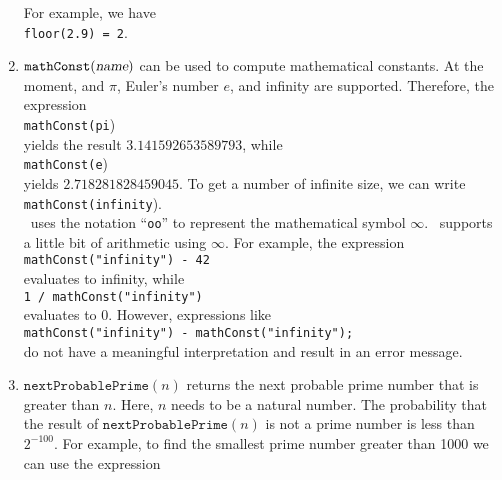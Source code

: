 \begin{enumerate}
      For example, we have
      \\[0.2cm]
      \hspace*{1.3cm}
      \texttt{floor(2.9) = 2}.
\item $\texttt{mathConst}(\textsl{name})$ can be used to compute mathematical constants.
      At the moment, and $\pi$, Euler's number $e$, and infinity are supported.  Therefore, the expression
      \\[0.2cm]
      \hspace*{1.3cm}
      \texttt{mathConst(pi})
      \\[0.2cm]
      yields the result $3.141592653589793$, while
      \\[0.2cm]
      \hspace*{1.3cm}
      \texttt{mathConst(e})
      \\[0.2cm]
      yields $2.718281828459045$.  To get a number of infinite size, we can write
      \\[0.2cm]
      \hspace*{1.3cm}
      \texttt{mathConst(infinity}).
      \\[0.2cm]
      \setlx\ uses the notation ``\texttt{oo}'' to represent the mathematical symbol
      $\infty$.  \setlx\ supports a little bit of arithmetic using $\infty$.  For example,
      the expression
      \\[0.2cm]
      \hspace*{1.3cm}
      \texttt{mathConst("infinity") - 42}
      \\[0.2cm]
      evaluates to infinity, while
      \\[0.2cm]
      \hspace*{1.3cm}
      \texttt{1 / mathConst("infinity")}
      \\[0.2cm]
      evaluates to $0$.  However, expressions like
      \\[0.2cm]
      \hspace*{1.3cm}
      \texttt{mathConst("infinity") - mathConst("infinity");}
      \\[0.2cm]
      do not have a meaningful interpretation and result in an error message.
\item $\mathtt{nextProbablePrime}(n)$ returns the next probable prime number that is greater than
      $n$.  Here, $n$ needs to be a natural number.   The probability that the result of 
      $\mathtt{nextProbablePrime}(n)$ is not a prime number is less than $2^{-100}$.
      For example, to find the smallest prime number greater than 1000 we can use the expression

\end{enumerate}
